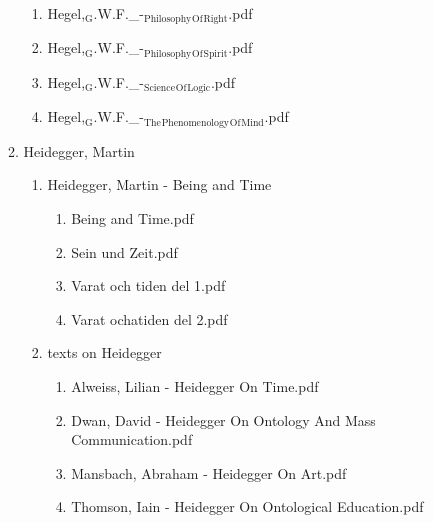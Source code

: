 \documentclass[11pt]{article}
\begin{document}
\begin{enumerate}
\begin{enumerate}
\begin{enumerate}
\item Hegel,$_{\text{G}}$.W.F.\_-$_{\text{Philosophy}}$$_{\text{Of}}$$_{\text{Right}}$.pdf
\label{sec-1-1-1-1-34-25-36-7}

\item Hegel,$_{\text{G}}$.W.F.\_-$_{\text{Philosophy}}$$_{\text{Of}}$$_{\text{Spirit}}$.pdf
\label{sec-1-1-1-1-34-25-36-8}

\item Hegel,$_{\text{G}}$.W.F.\_-$_{\text{Science}}$$_{\text{Of}}$$_{\text{Logic}}$.pdf
\label{sec-1-1-1-1-34-25-36-9}

\item Hegel,$_{\text{G}}$.W.F.\_-$_{\text{The}}$$_{\text{Phenomenology}}$$_{\text{Of}}$$_{\text{Mind}}$.pdf
\label{sec-1-1-1-1-34-25-36-10}
\end{enumerate}

\item Heidegger, Martin
\label{sec-1-1-1-1-34-25-37}
\begin{enumerate}
\item Heidegger, Martin - Being and Time
\label{sec-1-1-1-1-34-25-37-1}
\begin{enumerate}
\item Being and Time.pdf
\label{sec-1-1-1-1-34-25-37-1-1}

\item Sein und Zeit.pdf
\label{sec-1-1-1-1-34-25-37-1-2}

\item Varat och tiden del 1.pdf
\label{sec-1-1-1-1-34-25-37-1-3}

\item Varat ochatiden del 2.pdf
\label{sec-1-1-1-1-34-25-37-1-4}
\end{enumerate}

\item texts on Heidegger
\label{sec-1-1-1-1-34-25-37-2}
\begin{enumerate}
\item Alweiss, Lilian - Heidegger On Time.pdf
\label{sec-1-1-1-1-34-25-37-2-1}

\item Dwan, David - Heidegger On Ontology And Mass Communication.pdf
\label{sec-1-1-1-1-34-25-37-2-2}

\item Mansbach, Abraham - Heidegger On Art.pdf
\label{sec-1-1-1-1-34-25-37-2-3}

\item Thomson, Iain - Heidegger On Ontological Education.pdf
\label{sec-1-1-1-1-34-25-37-2-4}


\end{enumerate}
\end{enumerate}
\end{enumerate}
\end{enumerate}
\end{document}
